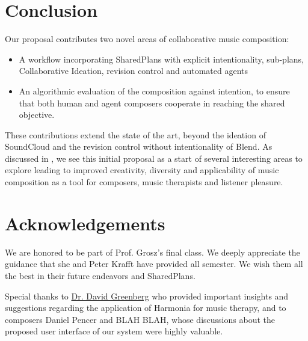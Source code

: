 \documentclass[final,authoryear,5p,times,twocolumn]{elsarticle}
\begin{document}
\section*{Conclusion}
  
Our proposal contributes two novel areas of collaborative music composition:
\begin{itemize}
	\item A workflow incorporating SharedPlans with explicit intentionality, sub-plans, Collaborative Ideation, revision control and automated agents
	\item An algorithmic evaluation of the composition against intention, to ensure that both human and agent composers cooperate in reaching the shared objective.
\end{itemize}


These contributions extend the state of the art, beyond the ideation of SoundCloud and the revision control without intentionality of Blend. As discussed in , we see this initial proposal as a start of several interesting areas to explore leading to improved creativity, diversity and applicability of music composition as a tool for composers, music therapists and listener pleasure.
 
 
\section*{Acknowledgements}

We are honored to be part of Prof. Grosz's final class. We deeply appreciate the guidance that she and Peter Krafft have provided all semester. We wish them all the best in their future endeavors and SharedPlans.

Special thanks to \href{https://www.psychologytoday.com/experts/david-m-greenberg-phd}{Dr. David Greenberg} who provided important insights and suggestions regarding the application of Harmonia for music therapy, and to composers Daniel Pencer and BLAH BLAH, whose discussions about the proposed user interface of our system were highly valuable.






\end{document}
